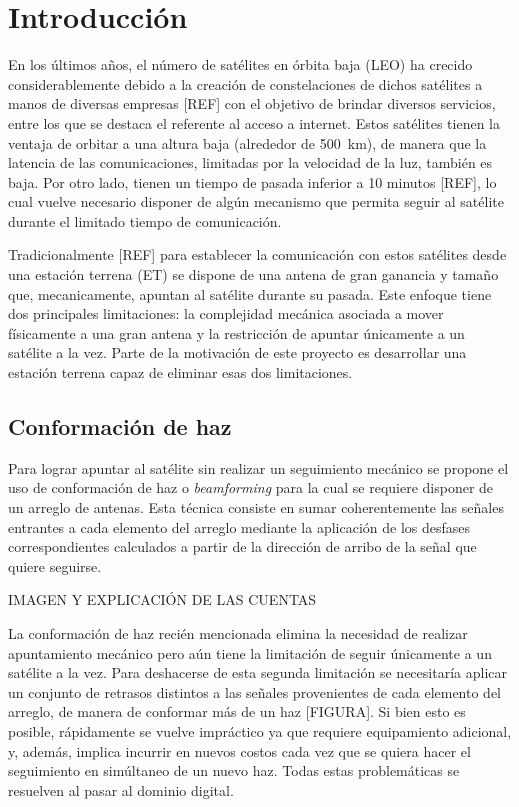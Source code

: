 \documentclass[../../main.tex]{subfiles}
\begin{document}
\chapter{Introducción}


En los últimos años, el número de satélites en órbita baja (LEO) ha crecido considerablemente debido a la creación de constelaciones de dichos satélites a manos de diversas empresas [REF] con el objetivo de brindar diversos servicios, entre los que se destaca el referente al acceso a internet. 
Estos satélites tienen la ventaja de orbitar a una altura baja (alrededor de 500~km), de manera que la latencia de las comunicaciones, limitadas por la velocidad de la luz, también es baja. 
Por otro lado, tienen un tiempo de pasada inferior a 10 minutos [REF], lo cual vuelve necesario disponer de algún mecanismo que permita seguir al satélite durante el limitado tiempo de comunicación.

Tradicionalmente [REF] para establecer la comunicación con estos satélites desde una estación terrena (ET) se dispone de una antena de gran ganancia y tamaño que, mecanicamente, apuntan al satélite durante su pasada.
Este enfoque tiene dos principales limitaciones: la complejidad mecánica asociada a mover físicamente a una gran antena y la restricción de apuntar únicamente a un satélite a la vez. Parte de la motivación de este proyecto es desarrollar una estación terrena capaz de eliminar esas dos limitaciones.


\section{Conformación de haz}

Para lograr apuntar al satélite sin realizar un seguimiento mecánico se propone el uso de conformación de haz o \textit{beamforming} para la cual se requiere disponer de un arreglo de antenas. Esta técnica consiste en sumar coherentemente las señales entrantes a cada elemento del arreglo mediante la aplicación de los desfases correspondientes calculados a partir de la dirección de arribo de la señal que quiere seguirse.

IMAGEN Y EXPLICACIÓN DE LAS CUENTAS

La conformación de haz recién mencionada elimina la necesidad de realizar apuntamiento mecánico pero aún tiene la limitación de seguir únicamente a un satélite a la vez. Para deshacerse de esta segunda limitación se necesitaría aplicar un conjunto de retrasos distintos a las señales provenientes de cada elemento del arreglo, de manera de conformar más de un haz [FIGURA].
Si bien esto es posible, rápidamente se vuelve impráctico ya que requiere equipamiento adicional, y, además, implica incurrir en nuevos costos cada vez que se quiera hacer el seguimiento en simúltaneo de un nuevo haz.
Todas estas problemáticas se resuelven al pasar al dominio digital. 
\end{document}

